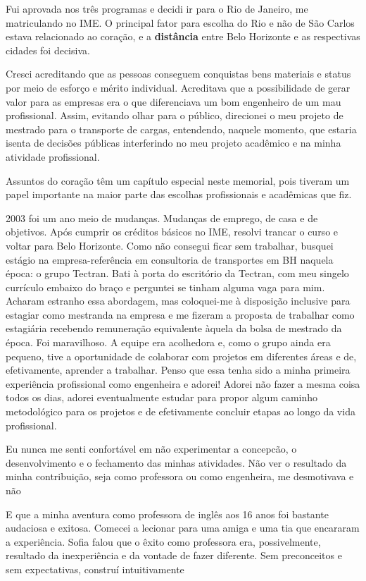 \documentclass[
]{book}
\begin{document}
Fui aprovada nos três programas e decidi ir para o Rio de Janeiro, me
matriculando no IME. O principal fator para escolha do Rio e não de São
Carlos estava relacionado ao coração, e a \textbf{distância} entre Belo
Horizonte e as respectivas cidades foi decisiva.

Cresci acreditando que as pessoas conseguem conquistas bens materiais e
status por meio de esforço e mérito individual. Acreditava que a
possibilidade de gerar valor para as empresas era o que diferenciava um
bom engenheiro de um mau profissional. Assim, evitando olhar para o
público, direcionei o meu projeto de mestrado para o transporte de
cargas, entendendo, naquele momento, que estaria isenta de decisões
públicas interferindo no meu projeto acadêmico e na minha atividade
profissional.

Assuntos do coração têm um capítulo especial neste memorial, pois
tiveram um papel importante na maior parte das escolhas profissionais e
acadêmicas que fiz.

2003 foi um ano meio de mudanças. Mudanças de emprego, de casa e de
objetivos. Após cumprir os créditos básicos no IME, resolvi trancar o
curso e voltar para Belo Horizonte. Como não consegui ficar sem
trabalhar, busquei estágio na empresa-referência em consultoria de
transportes em BH naquela época: o grupo Tectran. Bati à porta do
escritório da Tectran, com meu singelo currículo embaixo do braço e
perguntei se tinham alguma vaga para mim. Acharam estranho essa
abordagem, mas coloquei-me à disposição inclusive para estagiar como
mestranda na empresa e me fizeram a proposta de trabalhar como
estagiária recebendo remuneração equivalente àquela da bolsa de mestrado
da época. Foi maravilhoso. A equipe era acolhedora e, como o grupo ainda
era pequeno, tive a oportunidade de colaborar com projetos em diferentes
áreas e de, efetivamente, aprender a trabalhar. Penso que essa tenha
sido a minha primeira experiência profissional como engenheira e adorei!
Adorei não fazer a mesma coisa todos os dias, adorei eventualmente
estudar para propor algum caminho metodológico para os projetos e de
efetivamente concluir etapas ao longo da vida profissional.

Eu nunca me senti confortável em não experimentar a concepcão, o
desenvolvimento e o fechamento das minhas atividades. Não ver o
resultado da minha contribuição, seja como professora ou como
engenheira, me desmotivava e não

E que a minha aventura como professora de inglês aos 16 anos foi
bastante audaciosa e exitosa. Comecei a lecionar para uma amiga e uma
tia que encararam a experiência. Sofia falou que o êxito como professora
era, possivelmente, resultado da inexperiência e da vontade de fazer
diferente. Sem preconceitos e sem expectativas, construí intuitivamente
\end{document}
